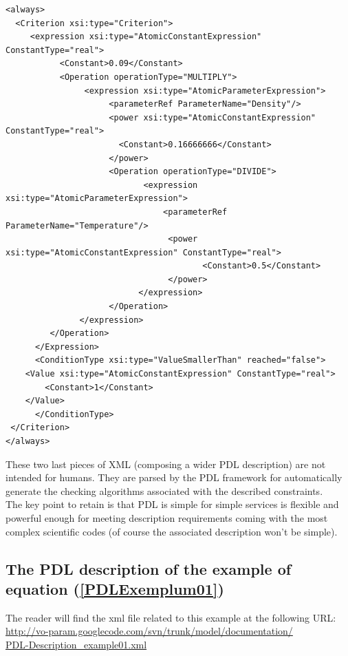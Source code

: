 \documentclass[a4paper,11pt] {ivoa}
\begin{document}
\begin{lstlisting}[style=listXML]
<always>
  <Criterion xsi:type="Criterion">
     <expression xsi:type="AtomicConstantExpression" ConstantType="real">
           <Constant>0.09</Constant>
           <Operation operationType="MULTIPLY">
                <expression xsi:type="AtomicParameterExpression">
                     <parameterRef ParameterName="Density"/>
                     <power xsi:type="AtomicConstantExpression" ConstantType="real">
                       <Constant>0.16666666</Constant>
                     </power>
                     <Operation operationType="DIVIDE">
                            <expression xsi:type="AtomicParameterExpression">
                                <parameterRef ParameterName="Temperature"/>
                                 <power xsi:type="AtomicConstantExpression" ConstantType="real">
                                        <Constant>0.5</Constant>
                                 </power>
                           </expression>
                     </Operation>
               </expression>
         </Operation>
      </Expression>
      <ConditionType xsi:type="ValueSmallerThan" reached="false">
	<Value xsi:type="AtomicConstantExpression" ConstantType="real">
		<Constant>1</Constant>
	</Value>
      </ConditionType>
 </Criterion>
</always>
\end{lstlisting}
These two last pieces of XML (composing a wider  PDL description) are not intended for humans. They are parsed by the PDL framework for automatically generate the checking algorithms associated with the described constraints.\\

\noindent The key point to retain is that PDL is simple for simple services is flexible and powerful enough for meeting description requirements coming with the most complex scientific codes (of course the associated description won't be simple).


\subsection{The PDL description of the example of equation (\ref{PDLExemplum01})}\label{Exemplum1XML}
The reader will find the xml file related to this example at the following URL:\\
\href{http://vo-param.googlecode.com/svn/trunk/model/documentation/PDL-Description_example01.xml}{http://vo-param.googlecode.com/svn/trunk/model/documentation/\\PDL-Description\_example01.xml}
\end{document}
